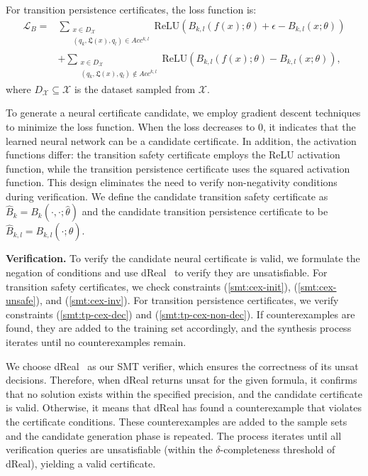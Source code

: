 For transition persistence certificates, the loss function is:
\begin{align}
\mathcal{L}_B = &\sum_{\substack{x \in D_{\mathcal{X}} \\ (q_k, \mathfrak{L}(x), q_l) \in Acc^{k,l}}} \text{ReLU}(B_{k,l}(f(x); \theta) + \epsilon - B_{k,l}(x; \theta)) \\
&+ \sum_{\substack{x \in D_{\mathcal{X}} \\ (q_k, \mathfrak{L}(x), q_l) \not\in Acc^{k,l}}} \text{ReLU}(B_{k,l}(f(x); \theta) - B_{k,l}(x; \theta)),
\end{align}
where $D_{\mathcal{X}} \subseteq \mathcal{X}$ is the dataset sampled from $\mathcal{X}$.

To generate a neural certificate candidate, we employ gradient descent techniques to minimize the loss function. When the loss decreases to 0, it indicates that the learned neural network can be a candidate certificate. In addition, the activation functions differ: the transition safety certificate employs the ReLU activation function, while the transition persistence certificate uses the squared activation function. This design eliminates the need to verify non-negativity conditions during verification. We define the candidate transition safety certificate as $\hat{B}_{k} = B_{k}(\cdot, \cdot; \hat{\theta})$ and the candidate transition persistence certificate to be $\hat{B}_{k,l} = B_{k,l}(\cdot; \hat{\theta})$.

\textbf{Verification.} To verify the candidate neural certificate is valid, we formulate the negation of conditions and use dReal~\cite{gao2013dreal} to verify they are unsatisfiable. For transition safety certificates, we check constraints (\ref{smt:cex-init}), (\ref{smt:cex-unsafe}), and (\ref{smt:cex-inv}). For transition persistence certificates, we verify constraints (\ref{smt:tp-cex-dec}) and (\ref{smt:tp-cex-non-dec}). If counterexamples are found, they are added to the training set accordingly, and the synthesis process iterates until no counterexamples remain.

We choose dReal~\cite{gao2013dreal} as our SMT verifier, which ensures the correctness of its unsat decisions. Therefore, when dReal returns unsat for the given formula, it confirms that no solution exists within the specified precision, and the candidate certificate is valid. Otherwise, it means that dReal has found a counterexample that violates the certificate conditions. These counterexamples are added to the sample sets and the candidate generation phase is repeated. The process iterates until all verification queries are unsatisfiable (within the $\delta$-completeness threshold of dReal), yielding a valid certificate.

